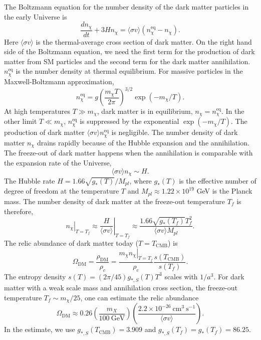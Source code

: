 \documentclass[doublespace,nopageskip]{VTthesis} %
\begin{document}
The Boltzmann equation for the number density of the dark matter particles in the early Universe is
\begin{equation}
    \frac{dn_\chi}{dt} + 3Hn_\chi = \langle\sigma v\rangle(n_\chi^{\mathrm{eq}} - n_\chi).
\end{equation}
Here $\langle\sigma v\rangle$ is the thermal-average cross section of dark matter. On the right hand side of the Boltzmann equation, we need the first term for the production of dark matter from SM particles and the second term for the dark matter annihilation. $n_\chi^{\mathrm{eq}}$ is the number density at thermal equilibrium. For massive particles in the Maxwell-Boltzmann approximation,
\begin{equation}
    n_\chi^{\mathrm{eq}} = g\left( \frac{m_\chi T}{2\pi} \right)^{3/2}\exp(-m_\chi/T).
\end{equation}
At high temperatures $T \gg m_\chi$, dark matter is in equilibrium, $n_\chi = n_\chi^{\mathrm{eq}}$. In the other limit $T \ll m_\chi$, $n_\chi^{\mathrm{eq}}$ is suppressed by the exponential $\exp(-m_\chi/T)$. The production of dark matter $\langle\sigma v\rangle n_\chi^{\mathrm{eq}}$ is negligible. The number density of dark matter $n_\chi$ drains rapidly because of the Hubble expansion and the annihilation. The freeze-out of dark matter happens when the annihilation is comparable with the expansion rate of the Universe,
\begin{equation}
    \langle\sigma v\rangle n_\chi \sim H.
\end{equation}
The Hubble rate $H = 1.66\sqrt{g_*(T)}/M_{pl}$, where $g_*(T)$ is the effective number of degree of freedom at the temperature $T$ and $M_{pl} \approx 1.22\times 10^{19}$ GeV is the Planck mass. The number density of dark matter at the freeze-out temperature $T_f$ is therefore,
\begin{equation}
    \left.n_\chi\right|_{T = T_f} \approx \left.\frac{H}{\langle\sigma v\rangle}\right|_{T = T_f} \approx \frac{1.66\sqrt{g_*(T_f)}T_f^2}{\langle\sigma v\rangle M_{pl}}.
\end{equation}
The relic abundance of dark matter today ($T=T_\mathrm{CMB}$) is
\begin{equation}
    \Omega_\mathrm{DM} = \frac{\rho_\mathrm{DM}}{\rho_c} = \frac{\left. m_\chi n_\chi\right|_{T = T_f}}{\rho_c}\frac{s(T_\mathrm{CMB})}{s(T_f)}.
\end{equation}
The entropy density $s(T) = (2\pi/45)g_{*,S}(T)T^3$ scales with $1/a^3$. For dark matter with a weak scale mass and annihilation cross section, the freeze-out temperature $T_f \sim m_\chi/25$, one can estimate the relic abundance
\begin{equation}
    \Omega_\mathrm{DM} \approx 0.26 \left( \frac{m_X}{100\ \mathrm{GeV}} \right) \left( \frac{2.2\times 10^{-26}\ \mathrm{cm}^3\ \mathrm{s}^{-1}}{\langle\sigma v\rangle} \right).
\end{equation}
In the estimate, we use $g_{*,S}(T_\mathrm{CMB}) = 3.909$ and $g_{*,S}(T_f) = g_{*}(T_f) = 86.25$. 
\end{document}
